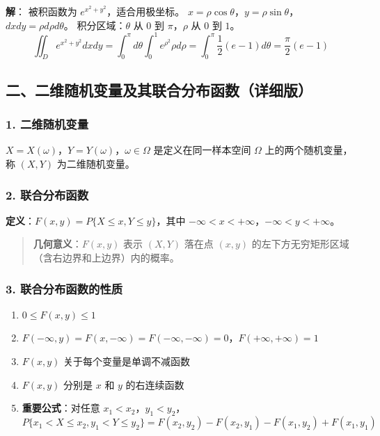 \documentclass[12pt,a4paper]{ctexart}
\newenvironment{myquote}
  {\par\vspace{0.5em}\begin{quote}\sffamily\color{gray}}
  {\end{quote}\vspace{0.5em}}
\begin{document}
\textbf{解}：
被积函数为 $e^{x^2+y^2}$，适合用极坐标。
$x = \rho \cos \theta$，$y = \rho \sin \theta$，$dxdy = \rho d\rho d\theta$。
积分区域：$\theta$ 从 $0$ 到 $\pi$，$\rho$ 从 $0$ 到 $1$。
\[
    \iint_D e^{x^2+y^2} dxdy = \int_0^\pi d\theta \int_0^1 e^{\rho^2} \rho d\rho = \int_0^\pi \frac{1}{2}(e-1) d\theta = \frac{\pi}{2}(e-1)
\]

\subsection{二、二维随机变量及其联合分布函数（详细版）}

\subsubsection{1. 二维随机变量}
$X = X(\omega)$，$Y = Y(\omega)$，$\omega \in \Omega$ 是定义在同一样本空间 $\Omega$ 上的两个随机变量，称 $(X, Y)$ 为二维随机变量。

\subsubsection{2. 联合分布函数}
\textbf{定义}：$F(x, y) = P\{X \le x, Y \le y\}$，其中 $-\infty < x < +\infty$，$-\infty < y < +\infty$。

\begin{myquote}
    \textbf{几何意义}：$F(x, y)$ 表示 $(X, Y)$ 落在点 $(x, y)$ 的左下方无穷矩形区域（含右边界和上边界）内的概率。
\end{myquote}

\subsubsection{3. 联合分布函数的性质}
\begin{enumerate}[noitemsep]
    \item $0 \le F(x, y) \le 1$
    \item $F(-\infty, y) = F(x, -\infty) = F(-\infty, -\infty) = 0$，$F(+\infty, +\infty) = 1$
    \item $F(x, y)$ 关于每个变量是单调不减函数
    \item $F(x, y)$ 分别是 $x$ 和 $y$ 的右连续函数
    \item \textbf{重要公式}：对任意 $x_1 < x_2$，$y_1 < y_2$，
          \[
              P\{x_1 < X \le x_2, y_1 < Y \le y_2\} = F(x_2, y_2) - F(x_2, y_1) - F(x_1, y_2) + F(x_1, y_1)
          \]
\end{enumerate}
\end{document}
